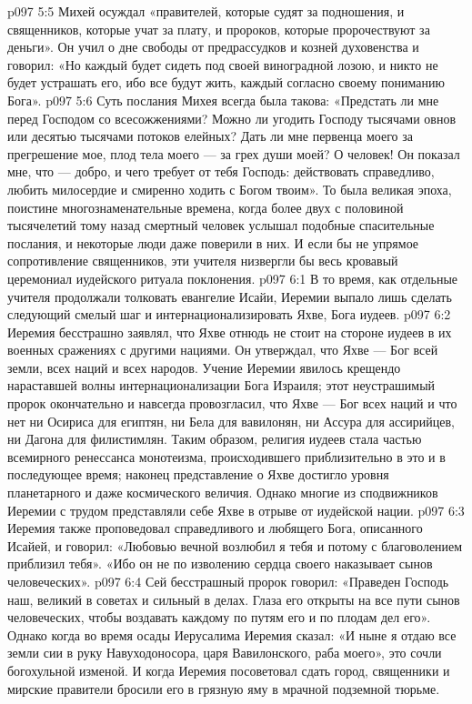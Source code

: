 \vs p097 5:5 Михей осуждал «правителей, которые судят за подношения, и священников, которые учат за плату, и пророков, которые пророчествуют за деньги». Он учил о дне свободы от предрассудков и козней духовенства и говорил: «Но каждый будет сидеть под своей виноградной лозою, и никто не будет устрашать его, ибо все будут жить, каждый согласно своему пониманию Бога».
\vs p097 5:6 Суть послания Михея всегда была такова: «Предстать ли мне перед Господом со всесожжениями? Можно ли угодить Господу тысячами овнов или десятью тысячами потоков елейных? Дать ли мне первенца моего за прегрешение мое, плод тела моего --- за грех души моей? О человек! Он показал мне, что --- добро, и чего требует от тебя Господь: действовать справедливо, любить милосердие и смиренно ходить с Богом твоим». То была великая эпоха, поистине многознаменательные времена, когда более двух с половиной тысячелетий тому назад смертный человек услышал подобные спасительные послания, и некоторые люди даже поверили в них. И если бы не упрямое сопротивление священников, эти учителя низвергли бы весь кровавый церемониал иудейского ритуала поклонения.
\vs p097 6:1 В то время, как отдельные учителя продолжали толковать евангелие Исайи, Иеремии выпало лишь сделать следующий смелый шаг и интернационализировать Яхве, Бога иудеев.
\vs p097 6:2 Иеремия бесстрашно заявлял, что Яхве отнюдь не стоит на стороне иудеев в их военных сражениях с другими нациями. Он утверждал, что Яхве --- Бог всей земли, всех наций и всех народов. Учение Иеремии явилось крещендо нараставшей волны интернационализации Бога Израиля; этот неустрашимый пророк окончательно и навсегда провозгласил, что Яхве --- Бог всех наций и что нет ни Осириса для египтян, ни Бела для вавилонян, ни Ассура для ассирийцев, ни Дагона для филистимлян. Таким образом, религия иудеев стала частью всемирного ренессанса монотеизма, происходившего приблизительно в это и в последующее время; наконец представление о Яхве достигло уровня планетарного и даже космического величия. Однако многие из сподвижников Иеремии с трудом представляли себе Яхве в отрыве от иудейской нации.
\vs p097 6:3 Иеремия также проповедовал справедливого и любящего Бога, описанного Исайей, и говорил: «Любовью вечной возлюбил я тебя и потому с благоволением приблизил тебя». «Ибо он не по изволению сердца своего наказывает сынов человеческих».
\vs p097 6:4 Сей бесстрашный пророк говорил: «Праведен Господь наш, великий в советах и сильный в делах. Глаза его открыты на все пути сынов человеческих, чтобы воздавать каждому по путям его и по плодам дел его». Однако когда во время осады Иерусалима Иеремия сказал: «И ныне я отдаю все земли сии в руку Навуходоносора, царя Вавилонского, раба моего», это сочли богохульной изменой. И когда Иеремия посоветовал сдать город, священники и мирские правители бросили его в грязную яму в мрачной подземной тюрьме.
